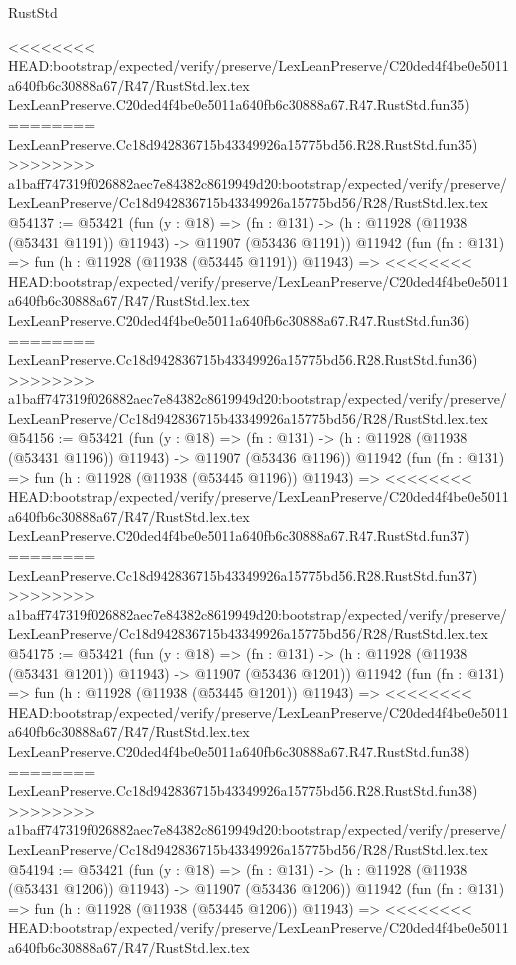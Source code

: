 \begin{lexlean}{RustStd}
\begin{coremodule}
{\begin{coremodule}
{{{{{{{{{{{{{{{{{{{{{{{{{{{{{{{{{{{{{{{{{{{{{{{{{{{{{{{{{{{{{{{{{{{{{{{{{{{{{{{{<<<<<<<< HEAD:bootstrap/expected/verify/preserve/LexLeanPreserve/C20ded4f4be0e5011a640fb6c30888a67/R47/RustStd.lex.tex
    LexLeanPreserve.C20ded4f4be0e5011a640fb6c30888a67.R47.RustStd.fun35)
========
    LexLeanPreserve.Cc18d942836715b43349926a15775bd56.R28.RustStd.fun35)
>>>>>>>> a1baff747319f026882aec7e84382c8619949d20:bootstrap/expected/verify/preserve/LexLeanPreserve/Cc18d942836715b43349926a15775bd56/R28/RustStd.lex.tex
@54137 := @53421
    (fun (y : @18) =>
    (fn : @131) -> (h : @11928 (@11938 (@53431 @1191)) @11943) -> @11907 (@53436 @1191))
    @11942
    (fun (fn : @131) =>
    fun (h : @11928 (@11938 (@53445 @1191)) @11943) =>
<<<<<<<< HEAD:bootstrap/expected/verify/preserve/LexLeanPreserve/C20ded4f4be0e5011a640fb6c30888a67/R47/RustStd.lex.tex
    LexLeanPreserve.C20ded4f4be0e5011a640fb6c30888a67.R47.RustStd.fun36)
========
    LexLeanPreserve.Cc18d942836715b43349926a15775bd56.R28.RustStd.fun36)
>>>>>>>> a1baff747319f026882aec7e84382c8619949d20:bootstrap/expected/verify/preserve/LexLeanPreserve/Cc18d942836715b43349926a15775bd56/R28/RustStd.lex.tex
@54156 := @53421
    (fun (y : @18) =>
    (fn : @131) -> (h : @11928 (@11938 (@53431 @1196)) @11943) -> @11907 (@53436 @1196))
    @11942
    (fun (fn : @131) =>
    fun (h : @11928 (@11938 (@53445 @1196)) @11943) =>
<<<<<<<< HEAD:bootstrap/expected/verify/preserve/LexLeanPreserve/C20ded4f4be0e5011a640fb6c30888a67/R47/RustStd.lex.tex
    LexLeanPreserve.C20ded4f4be0e5011a640fb6c30888a67.R47.RustStd.fun37)
========
    LexLeanPreserve.Cc18d942836715b43349926a15775bd56.R28.RustStd.fun37)
>>>>>>>> a1baff747319f026882aec7e84382c8619949d20:bootstrap/expected/verify/preserve/LexLeanPreserve/Cc18d942836715b43349926a15775bd56/R28/RustStd.lex.tex
@54175 := @53421
    (fun (y : @18) =>
    (fn : @131) -> (h : @11928 (@11938 (@53431 @1201)) @11943) -> @11907 (@53436 @1201))
    @11942
    (fun (fn : @131) =>
    fun (h : @11928 (@11938 (@53445 @1201)) @11943) =>
<<<<<<<< HEAD:bootstrap/expected/verify/preserve/LexLeanPreserve/C20ded4f4be0e5011a640fb6c30888a67/R47/RustStd.lex.tex
    LexLeanPreserve.C20ded4f4be0e5011a640fb6c30888a67.R47.RustStd.fun38)
========
    LexLeanPreserve.Cc18d942836715b43349926a15775bd56.R28.RustStd.fun38)
>>>>>>>> a1baff747319f026882aec7e84382c8619949d20:bootstrap/expected/verify/preserve/LexLeanPreserve/Cc18d942836715b43349926a15775bd56/R28/RustStd.lex.tex
@54194 := @53421
    (fun (y : @18) =>
    (fn : @131) -> (h : @11928 (@11938 (@53431 @1206)) @11943) -> @11907 (@53436 @1206))
    @11942
    (fun (fn : @131) =>
    fun (h : @11928 (@11938 (@53445 @1206)) @11943) =>
<<<<<<<< HEAD:bootstrap/expected/verify/preserve/LexLeanPreserve/C20ded4f4be0e5011a640fb6c30888a67/R47/RustStd.lex.tex
}}}}}}}}}}}}}}}}}}}}}}}}}}}}}}}}}}}}}}}}}}}}}}}}}}}}}}}}}}}}}}}}}}}}}}}}}}}}}}}}
\end{coremodule}}
\end{coremodule}
\end{lexlean}
